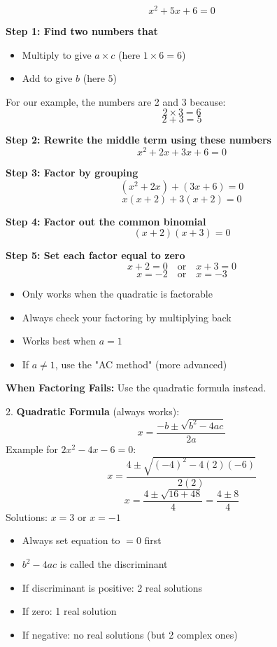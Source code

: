 \documentclass{article} %
\begin{document}
\[ x^2 + 5x + 6 = 0 \]

\textbf{Step 1: Find two numbers that}
\begin{itemize}
    \item Multiply to give \( a \times c \) (here \( 1 \times 6 = 6 \))
    \item Add to give \( b \) (here \( 5 \))
\end{itemize}

For our example, the numbers are 2 and 3 because:
\[ 2 \times 3 = 6 \]
\[ 2 + 3 = 5 \]

\textbf{Step 2: Rewrite the middle term using these numbers}
\[ x^2 + 2x + 3x + 6 = 0 \]

\textbf{Step 3: Factor by grouping}
\[ (x^2 + 2x) + (3x + 6) = 0 \]
\[ x(x + 2) + 3(x + 2) = 0 \]

\textbf{Step 4: Factor out the common binomial}
\[ (x + 2)(x + 3) = 0 \]

\textbf{Step 5: Set each factor equal to zero}
\[ x + 2 = 0 \quad \text{or} \quad x + 3 = 0 \]
\[ x = -2 \quad \text{or} \quad x = -3 \]

\begin{itemize}
    \item Only works when the quadratic is factorable
    \item Always check your factoring by multiplying back
    \item Works best when \( a = 1 \)
    \item If \( a \neq 1 \), use the "AC method" (more advanced)
\end{itemize}

\textbf{When Factoring Fails:} Use the quadratic formula instead.

2. \textbf{Quadratic Formula} (always works):
\[
x = \frac{-b \pm \sqrt{b^2 - 4ac}}{2a}
\]
Example for \( 2x^2 - 4x - 6 = 0 \):
\[
x = \frac{4 \pm \sqrt{(-4)^2 - 4(2)(-6)}}{2(2)}
\]
\[
x = \frac{4 \pm \sqrt{16 + 48}}{4} = \frac{4 \pm 8}{4}
\]
Solutions: \( x = 3 \) or \( x = -1 \)

\begin{itemize}
    \item Always set equation to \( = 0 \) first
    \item \( b^2 - 4ac \) is called the discriminant
    \item If discriminant is positive: 2 real solutions
    \item If zero: 1 real solution
    \item If negative: no real solutions (but 2 complex ones)
\end{itemize}
\end{document}
